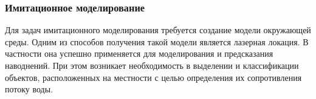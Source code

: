 \subsubsection{Имитационное моделирование}

Для задач имитационного моделирования требуется создание модели окружающей среды. Одним из способов получения такой модели является лазерная локация. В частности она успешно применяется для моделирования и предсказания наводнений\cite{flood}. При этом возникает необходимость в выделении и классификации объектов, расположенных на местности с целью определения их сопротивления потоку воды.